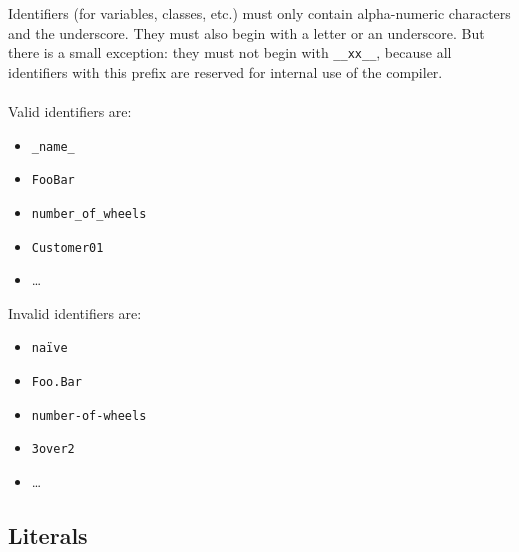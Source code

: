 \documentclass{report}
\begin{document}
Identifiers (for variables, classes, etc.) must only contain alpha-numeric characters and the underscore.
They must also begin with a letter or an underscore. But there is a small exception: they must not begin with
\texttt{\_\_xx\_\_}, because all identifiers with this prefix are reserved for internal use of the compiler. \\ \\
Valid identifiers are:
\begin{itemize}
	\item \texttt{\_name\_}
	\item \texttt{FooBar}
	\item \texttt{number\_of\_wheels}
	\item \texttt{Customer01}
	\item \dots
\end{itemize}
Invalid identifiers are:
\begin{itemize}
	\item \texttt{na\"{i}ve}
	\item \texttt{Foo.Bar}
	\item \texttt{number-of-wheels}
	\item \texttt{3over2}
	\item \dots
\end{itemize}

\subsection{Literals}
\end{document}
